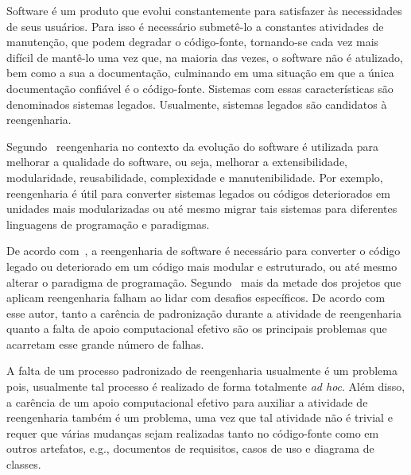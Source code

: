
Software é um produto que evolui constantemente para satisfazer às necessidades de seus usuários. Para isso é necessário submetê-lo a constantes atividades de manutenção, que podem degradar o código-fonte, tornando-se cada vez mais difícil de mantê-lo uma vez que, na maioria das vezes, o software não é atulizado, bem como a sua a documentação, culminando em uma situação em que a única documentação confiável é o código-fonte. Sistemas com essas características são denominados sistemas legados. Usualmente, sistemas legados são candidatos à reengenharia.


Segundo~\citet{refactImpro} reengenharia no contexto da evolução do software é utilizada para melhorar a qualidade do software, ou seja, melhorar a extensibilidade, modularidade, reusabilidade, complexidade e manutenibilidade. Por exemplo, reengenharia é útil para converter sistemas legados ou códigos deteriorados em unidades mais modularizadas ou até mesmo migrar tais sistemas para diferentes linguagens de programação e paradigmas.


De acordo com~\citet{chikofskyTax}, a reengenharia de software  é necessário para converter o código legado ou deteriorado em um código mais modular e estruturado, ou até mesmo alterar o paradigma de programação. Segundo~\citet{Sneed:2005} mais da metade dos projetos que aplicam reengenharia falham ao lidar com desafios específicos. De acordo com esse autor, tanto a carência de  padronização durante a atividade de reengenharia quanto a falta de apoio computacional efetivo são os principais problemas que acarretam esse grande número de falhas.  

A falta de um processo padronizado de reengenharia usualmente é um problema pois, usualmente tal processo é realizado de forma totalmente \textit{ad hoc}. Além disso, a carência de um apoio computacional efetivo para auxiliar a atividade de reengenharia também é um problema, uma vez que tal atividade não é trivial e requer que várias mudanças sejam realizadas tanto no código-fonte como em outros artefatos, e.g., documentos de requisitos, casos de uso e diagrama de classes. 

